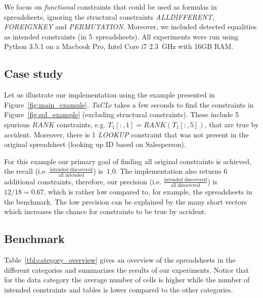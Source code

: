 \documentclass{IEEEtran}
\newcommand{\format}[1]{\textit{#1}\xspace}
\newcommand{\sname}{\format{TaCLe}}
\newcommand{\range}[3]{\ensuremath{#1[#2,#3]}}
\newcommand{\rangeall}{:}
\newcommand{\eccalc}[2]{\ensuremath{#1 = #2}}
\newcommand{\ecrank}[2]{\eccalc{#1}{\textit{RANK}(#2)}}
\theoremstyle{definition}
\begin{document}
We focus on \textit{functional} constraints that could be used as formulas in spreadsheets, ignoring the structural constraints \textit{ALLDIFFERENT}, \textit{FOREIGNKEY} and \textit{PERMUTATION}.
Moreover, we included detected equalities as intended constraints (in 5~spreadsheets).
All experiments were run using Python 3.5.1 on a Macbook Pro, Intel Core i7 2.3~GHz with 16GB RAM.







\subsection{Case study}
Let us illustrate our implementation using the example presented in Figure~\ref{fig:main_example}.
\sname takes a few seconds to find the constraints in Figure~\ref{fig:sol_example} (excluding structural constraints).
These include 5 spurious $\textit{RANK}$ constraints, e.g. $\ecrank{\range{T_1}{\rangeall}{1}}{\range{T_1}{\rangeall}{5}}$, that are true by accident.
Moreover, there is 1 \textit{LOOKUP} constraint that was not present in the original spreadsheet (looking up ID based on Salesperson).

For this example our primary goal of finding all original constraints is achieved, the recall (i.e. $\frac{\text{intended discovered}}{\text{all intended}}$) is~$1.0$.
The implementation also returns 6 additional constraints, therefore, our precision (i.e. $\frac{\text{intended discovered}}{\text{all discovered}}$) is $12/18 = 0.67$, which is rather low compared to, for example, the spreadsheets in the benchmark.
The low precision can be explained by the many short vectors which increases the chance for constraints to be true by accident.





\subsection{Benchmark}
Table~\ref{tbl:category_overview} gives an overview of the spreadsheets in the different categories and summarizes the results of our experiments.
Notice that for the data category the average number of cells is higher while the number of intended constraints and tables is lower compared to the other categories.
\end{document}
